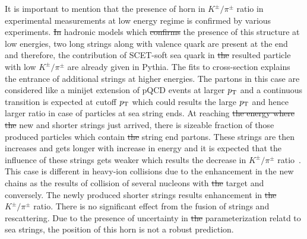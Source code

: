 \documentclass{article}
\newcommand{\ppt}{$p_{\rm T}$}
\providecommand{\DIFadd}[1]{{\protect\color{blue}\uwave{#1}}} %
\providecommand{\DIFdel}[1]{{\protect\color{red}\sout{#1}}}                      %
\providecommand{\DIFaddbegin}{} %
\providecommand{\DIFaddend}{} %
\providecommand{\DIFdelbegin}{} %
\providecommand{\DIFdelend}{} %
\begin{document}
It is important to mention that the presence of horn in $K^\pm/\pi^\pm$ ratio in experimental measurements at low energy regime is confirmed by various experiments. \DIFdelbegin \DIFdel{In }\DIFdelend \DIFaddbegin \DIFadd{The }\DIFaddend hadronic models which \DIFdelbegin \DIFdel{confirms }\DIFdelend \DIFaddbegin \DIFadd{confirm }\DIFaddend the presence of this structure at low energies, two long strings along with valence quark are present at the end and therefore, the contribution of SCET-soft sea quark in \DIFdelbegin \DIFdel{the }\DIFdelend resulted particle with low $K^\pm/\pi^\pm$ are already given in Pythia. The fits to cross-section explains the entrance of additional strings at higher energies. The partons in this case are considered like a minijet extension of pQCD events at larger {\ppt} and a continuous transition is expected at cutoff {\ppt} which could results the large {\ppt} and hence larger ratio in case of particles at sea string ends. At reaching \DIFdelbegin \DIFdel{the energy where the }\DIFdelend \DIFaddbegin \DIFadd{energy where }\DIFaddend new and shorter strings just arrived, there is sizeable fraction of those produced particles which contain \DIFdelbegin \DIFdel{the }\DIFdelend string end partons. These strings are then increases and gets longer with \DIFaddbegin \DIFadd{the }\DIFaddend increase in energy and it is expected that the influence of these strings gets weaker which results the decrease in $K^\pm/\pi^\pm$ ratio~\cite{Bhattacharyya:2017rmc}. This case is different in heavy-ion collisions due to the enhancement in the new chains as the results of collision of several nucleons with \DIFdelbegin \DIFdel{the }\DIFdelend target and conversely. The newly produced shorter strings results enhancement in \DIFdelbegin \DIFdel{the }\DIFdelend $K^\pm/\pi^\pm$ ratio. There is no significant effect from the fusion of strings and rescattering. Due to the presence of uncertainty in \DIFdelbegin \DIFdel{the }\DIFdelend parameterization relatd to sea strings, the position of this horn is not a robust prediction.  
\end{document}
